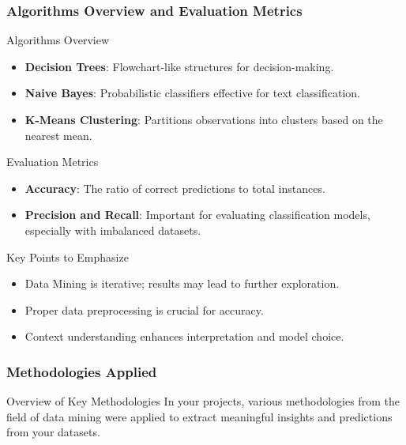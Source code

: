 \documentclass[aspectratio=169]{beamer}
\begin{document}
\begin{frame}[fragile]
    \frametitle{Algorithms Overview and Evaluation Metrics}
    \begin{block}{Algorithms Overview}
        \begin{itemize}
            \item \textbf{Decision Trees}: Flowchart-like structures for decision-making.
            \item \textbf{Naive Bayes}: Probabilistic classifiers effective for text classification.
            \item \textbf{K-Means Clustering}: Partitions observations into clusters based on the nearest mean.
        \end{itemize}
    \end{block}

    \begin{block}{Evaluation Metrics}
        \begin{itemize}
            \item \textbf{Accuracy}: The ratio of correct predictions to total instances.
            \item \textbf{Precision and Recall}: Important for evaluating classification models, especially with imbalanced datasets.
        \end{itemize}
    \end{block}
    
    \begin{block}{Key Points to Emphasize}
        \begin{itemize}
            \item Data Mining is iterative; results may lead to further exploration.
            \item Proper data preprocessing is crucial for accuracy.
            \item Context understanding enhances interpretation and model choice.
        \end{itemize}
    \end{block}
\end{frame}

\begin{frame}
    \frametitle{Methodologies Applied}
    \begin{block}{Overview of Key Methodologies}
        In your projects, various methodologies from the field of data mining were applied to extract meaningful insights and predictions from your datasets.
    \end{block}
\end{frame}
\end{document}
